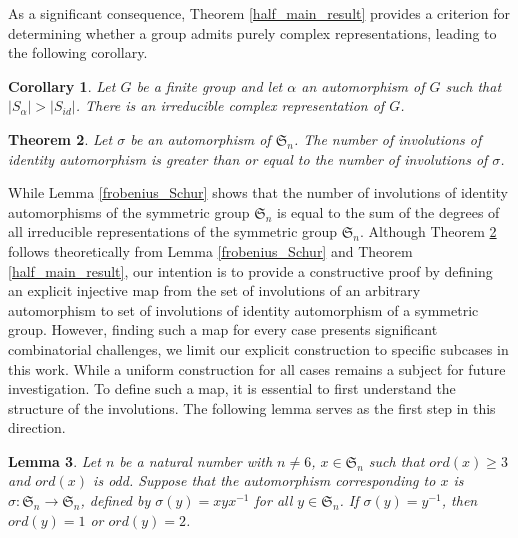 \documentclass[oneside]{amsart}
\theoremstyle{plain}
\newtheorem{theorem}{Theorem}[section] %
\newtheorem{lemma}[theorem]{Lemma} %
\newtheorem{corollary}[theorem]{Corollary}%
\theoremstyle{definition}
\theoremstyle{remark}
\newcommand{\ord}{ord}
\begin{document}
    As a significant consequence, Theorem \ref{half_main_result} provides a criterion for determining whether a group admits purely complex representations, leading to the following corollary.
    \begin{corollary}
        Let $G$ be a finite group and let $\alpha$ an automorphism of $G$ such that $|S_{\alpha}| > |S_{id}|$. There is an irreducible complex representation of $G$.
    \end{corollary}
    \begin{theorem}\label{final_identity_greater_other}
        Let $\sigma$ be an automorphism of $\mathfrak{S}_n$. The number of involutions of identity automorphism is greater than or equal to the number of involutions of $\sigma$.
    \end{theorem}
    While Lemma \ref{frobenius_Schur} shows that the number of involutions of identity automorphisms of the symmetric group $\mathfrak{S}_n$ is equal to the sum of the degrees of all irreducible representations of the symmetric group $\mathfrak{S}_n$.  Although Theorem \ref{final_identity_greater_other} follows theoretically from Lemma \ref{frobenius_Schur} and Theorem \ref{half_main_result}, our intention is to provide a constructive proof by defining an explicit injective map from the set of involutions of an arbitrary automorphism to set of involutions of identity automorphism of a symmetric group. However, finding such a map for every case presents significant combinatorial challenges, we limit our explicit construction to specific subcases in this work. While a uniform construction for all cases remains a subject for future investigation. To define such a map, it is essential to first understand the structure of the involutions. The following lemma serves as the first step in this direction.
    \begin{lemma}\label{all_involutions_of_greater_order_3}
            Let $n$ be a natural number with $n \neq 6$, $x\in\mathfrak{S}_n$ such that $\ord (x) \geq 3$ and $\ord(x)$ is odd. Suppose that the automorphism corresponding to $x$ is $\sigma : \mathfrak{S}_n \rightarrow \mathfrak{S}_n$, defined by $\sigma(y) = xyx^{-1}$ for all $y \in \mathfrak{S}_n$. If $\sigma(y) = y^{-1}$, then $\ord (y) = 1$ or $\ord (y) = 2$.
        \end{lemma}
        
\end{document}
